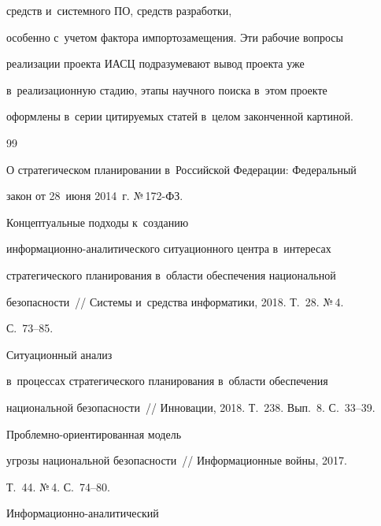 средств и~системного ПО, средств разработки, 


особенно с~учетом фактора импортозамещения. Эти рабочие вопросы 


реализации проекта ИАСЦ подразумевают вывод проекта уже 


в~реализационную стадию, этапы научного поиска в~этом проекте 


оформлены в~серии цитируемых статей в~целом законченной картиной.





{\small\frenchspacing


{%




\begin{thebibliography}{99}







О стратегическом планировании в~Российской Федерации: Федеральный 


закон от 28~июня 2014~г. №\,172-ФЗ.




 Концептуальные подходы к~созданию 


информационно-ана\-ли\-ти\-че\-ско\-го ситуационного центра в~интересах 


стратегического планирования в~области обеспечения национальной 


безопасности~/\!\!/ Системы и~средства информатики, 2018. Т.~28. №\,4. 


С.~73--85.




 Ситуационный анализ 


в~процессах стратегического планирования в~области обеспечения 


национальной безопасности~/\!\!/ Инновации, 2018. Т.~238. Вып.~8. С.~33--39.




 Проблемно-ориентированная модель 


угрозы национальной безопасности~/\!\!/ Информационные войны, 2017. 


Т.~44. №\,4. С.~74--80.




 Информационно-аналитический 



\end{thebibliography}}}
